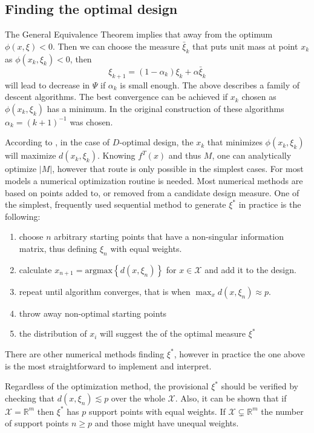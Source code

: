 \documentclass[12pt]{iopart}
\begin{document}
\subsection{Finding the optimal design}
\label{sec:findoptimal}
The General Equivalence Theorem implies that away from the optimum $\phi(x, \xi) < 0$. Then we can choose the measure $\bar \xi_k$ that puts unit mass at point $x_k$ as $\phi(x_k, \xi_k) < 0$, then
\begin{equation}
\xi_{k+1} = (1-\alpha_k) \xi_k + \alpha \bar \xi_k
\end{equation}
will lead to decrease in $\Psi$ if $\alpha_k$ is small enough. The above describes a family of descent algorithms. The best convergence can be achieved if $x_k$ chosen as $\phi(x_k, \xi_k)$ has a minimum. In the original construction of these algorithms $\alpha_k = (k+1)^{-1}$ was chosen.

According to , in the case of $D$-optimal design, the $x_k$ that minimizes $\phi(x_k, \xi_k)$ will maximize $d(x_k, \xi_k)$. Knowing $f^T(x)$ and thus $M$, one can analytically optimize $|M|$, however that route is only possible in the simplest cases. For most models a numerical optimization routine is needed. Most numerical methods are based on points added to, or removed from a candidate design measure. One of the simplest, frequently used sequential method to generate $\xi^*$ in practice is the following:
\begin{enumerate}
\item choose $n$ arbitrary starting points that have a non-singular information matrix, thus defining $\xi_n$ with equal weights.
\item calculate $x_{n+1} = \mathrm{argmax}\left\{d(x, \xi_n)\right\}$ for $x \in \mathcal{X}$ and add it to the design.
\item repeat until algorithm converges, that is when $\max_{x} d(x, \xi_{n}) \approx p$.
\item throw away non-optimal starting points
\item the distribution of $x_i$ will suggest the of the optimal measure $\xi^*$
\end{enumerate}
There are other numerical methods finding $\xi^*$, however in practice the one above is the most straightforward to implement and interpret.

Regardless of the optimization method, the provisional $\xi^*$ should be verified by checking that $d(x, \xi_{n}) \lesssim p$ over the whole $\mathcal{X}$. Also, it can be shown that if $\mathcal{X} = \mathbb{R}^m$ then $\xi^*$ has $p$ support points with equal weights. If $\mathcal{X} \subsetneq \mathbb{R}^m$ the number of support points $n \geq p$ and those might have unequal weights.
\end{document}
